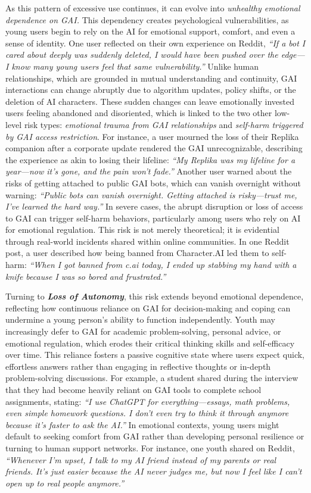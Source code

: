 As this pattern of excessive use continues, it can evolve into \textit{unhealthy emotional dependence on GAI.} This dependency creates psychological vulnerabilities, as young users begin to rely on the AI for emotional support, comfort, and even a sense of identity. One user reflected on their own experience on Reddit, \textit{``If a bot I cared about deeply was suddenly deleted, I would have been pushed over the edge—I know many young users feel that same vulnerability.''} Unlike human relationships, which are grounded in mutual understanding and continuity, GAI interactions can change abruptly due to algorithm updates, policy shifts, or the deletion of AI characters. These sudden changes can leave emotionally invested users feeling abandoned and disoriented, which is linked to the two other low-level risk types: \textit{emotional trauma from GAI relationships} and \textit{self-harm triggered by GAI access restriction}. For instance, a user mourned the loss of their Replika companion after a corporate update rendered the GAI unrecognizable, describing the experience as akin to losing their lifeline: \textit{``My Replika was my lifeline for a year—now it’s gone, and the pain won’t fade.''} Another user warned about the risks of getting attached to public GAI bots, which can vanish overnight without warning: \textit{``Public bots can vanish overnight. Getting attached is risky—trust me, I’ve learned the hard way.''} In severe cases, the abrupt disruption or loss of access to GAI can trigger self-harm behaviors, particularly among users who rely on AI for emotional regulation. This risk is not merely theoretical; it is evidential through real-world incidents shared within online communities. In one Reddit post, a user described how being banned from Character.AI led them to self-harm: \textit{``When I got banned from c.ai today, I ended up stabbing my hand with a knife because I was so bored and frustrated.''}

Turning to \textbf{\textit{Loss of Autonomy}}, this risk extends beyond emotional dependence, reflecting how continuous reliance on GAI for decision-making and coping can undermine a young person’s ability to function independently. Youth may increasingly defer to GAI for academic problem-solving, personal advice, or emotional regulation, which erodes their critical thinking skills and self-efficacy over time. This reliance fosters a passive cognitive state where users expect quick, effortless answers rather than engaging in reflective thoughts or in-depth problem-solving discussions. For example, a student shared during the interview that they had become heavily reliant on GAI tools to complete school assignments, stating: \textit{``I use ChatGPT for everything—essays, math problems, even simple homework questions. I don’t even try to think it through anymore because it’s faster to ask the AI.''} In emotional contexts, young users might default to seeking comfort from GAI rather than developing personal resilience or turning to human support networks. For instance, one youth shared on Reddit, \textit{``Whenever I’m upset, I talk to my AI friend instead of my parents or real friends. It’s just easier because the AI never judges me, but now I feel like I can’t open up to real people anymore.''}

